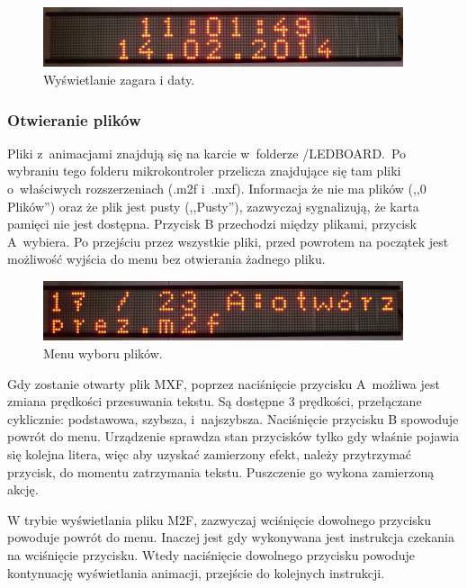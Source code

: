 \begin{figure}[htb]
	\begin{center}
		\includegraphics[width=300pt]{figures/zegaridata.png}
	\end{center}
	\caption{Wyświetlanie zagara i daty.}
\end{figure}

\subsubsection*{Otwieranie plików}
Pliki z~animacjami znajdują się na karcie w~folderze /LEDBOARD.~Po wybraniu tego folderu mikrokontroler przelicza znajdujące się tam pliki o~właściwych rozszerzeniach (.m2f i~.mxf). Informacja że nie ma plików (,,0 Plików'') oraz że plik jest pusty (,,Pusty''), zazwyczaj sygnalizują, że karta pamięci nie jest dostępna. Przycisk B przechodzi między plikami, przycisk A~wybiera. Po przejściu przez wszystkie pliki, przed powrotem na początek jest możliwość wyjścia do menu bez otwierania żadnego pliku.

\begin{figure}[htb]
	\begin{center}
		\includegraphics[width=300pt]{figures/wybierzplik.png}
	\end{center}
	\caption{Menu wyboru plików.}
\end{figure}

Gdy zostanie otwarty plik MXF, poprzez naciśnięcie przycisku A~możliwa jest zmiana prędkości przesuwania tekstu. Są dostępne 3 prędkości, przełączane cyklicznie: podstawowa, szybsza, i~najszybsza. Naciśnięcie przycisku B spowoduje powrót do menu. Urządzenie sprawdza stan przycisków tylko gdy właśnie pojawia się kolejna litera, więc aby uzyskać zamierzony efekt, należy przytrzymać przycisk, do momentu zatrzymania tekstu. Puszczenie go wykona zamierzoną akcję.

W trybie wyświetlania pliku M2F, zazwyczaj wciśnięcie dowolnego przycisku powoduje powrót do menu. Inaczej jest gdy wykonywana jest instrukcja czekania na wciśnięcie przycisku. Wtedy naciśnięcie dowolnego przycisku powoduje kontynuację wyświetlania animacji, przejście do kolejnych instrukcji.

